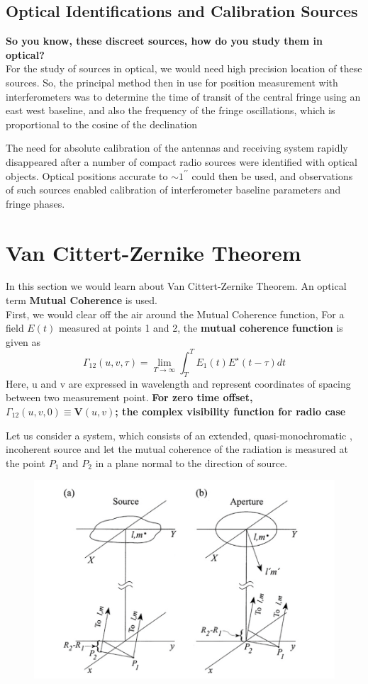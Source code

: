 \documentclass[10pt]{report}
\newcommand{\mbf}[1]{\mathbf{#1}}
\begin{document}
\subsection*{Optical Identifications and Calibration Sources}
\textbf{So you know, these discreet sources, how do you study them in optical?}\\
For the study of sources in optical, we would need high precision location of these sources. So, the principal method then in use for position measurement with interferometers was to determine the time of transit of the central fringe using an east west baseline, and also the frequency of the fringe oscillations, which is proportional to the cosine of the declination

The need for absolute calibration of the antennas and receiving system rapidly disappeared after a number of compact radio sources were identified with optical objects. Optical positions accurate to $\sim 1^{\prime \prime}$ could then be used, and observations of such sources enabled calibration of interferometer baseline parameters and fringe phases. 
\newpage
\section{Van Cittert-Zernike Theorem}
In this section we would learn about Van Cittert-Zernike Theorem. An optical term \textbf{Mutual Coherence} is used.\\
First, we would clear off the air around the Mutual Coherence function, For a field $E(t)$ measured at points 1 and 2, the \textbf{mutual coherence function} is given as
\begin{equation}
\Gamma_{12}(u,v,\tau)=\lim_{T\rightarrow\infty}\int^T_TE_1(t)E^\star(t-\tau)dt
\end{equation}
Here, u and v are expressed in wavelength and represent coordinates of spacing between two measurement point. \textbf{For zero time offset, $\Gamma_{12}(u,v,0) \equiv \mbf{V}(u,v)$; the complex visibility function for radio case}

Let us consider a system, which consists of an extended, quasi-monochromatic , incoherent source and let the mutual coherence of the radiation is measured at the point $P_1$ and $P_2$ in a plane normal to the direction of source.
\begin{figure}[h!]
\includegraphics[width=\linewidth]{notesfig1.png}
\label{VCZ}
\end{figure}
\end{document}
